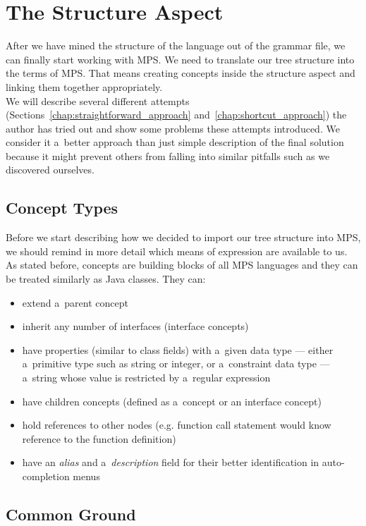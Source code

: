 \section{The Structure Aspect}

After we have mined the structure of the language out of the grammar file, we can finally start working with MPS.
We need to translate our tree structure into the terms of MPS.
That means creating concepts inside the structure aspect and linking them together appropriately.
\\

We will describe several different attempts (Sections~\ref{chap:straightforward_approach} and~\ref{chap:shortcut_approach}) the author has tried out and show some problems these attempts introduced.
We consider it a~better approach than just simple description of the final solution because it might prevent others from falling into similar pitfalls such as we discovered ourselves.


\subsection{Concept Types}

Before we start describing how we decided to import our tree structure into MPS, we should remind in more detail which means of expression are available to us.
As stated before, concepts are building blocks of all MPS languages and they can be treated similarly as Java classes.
They can:

\begin{itemize}
	\item extend a~parent concept
	\item inherit any number of interfaces (interface concepts)
	\item have properties (similar to class fields) with a~given data type --- either a~primitive type such as string or integer, or a~constraint data type --- a~string whose value is restricted by a~regular expression
	\item have children concepts (defined as a~concept or an interface concept)
	\item hold references to other nodes (e.g. function call statement would know reference to the function definition)
	\item have an \textit{alias} and a~\textit{description} field for their better identification in auto-completion menus
\end{itemize}

\subsection{Common Ground}
\label{chap:common_ground}

